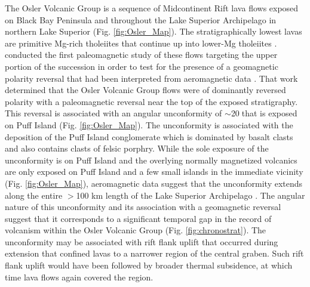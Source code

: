 \documentclass[11pt,letterpaper]{article}
\begin{document}
The Osler Volcanic Group is a sequence of Midcontinent Rift lava flows exposed on Black Bay Peninsula and throughout the Lake Superior Archipelago in northern Lake Superior (Fig. \ref{fig:Osler_Map}). The stratigraphically lowest lavas are primitive Mg-rich tholeiites that continue up into lower-Mg tholeiites \citep{Keays2015a}. \cite{Halls1974a} conducted the first paleomagnetic study of these flows targeting the upper portion of the succession in order to test for the presence of a geomagnetic polarity reversal that had been interpreted from aeromagnetic data \citep{Halls1972a}. That work determined that the Osler Volcanic Group flows were of dominantly reversed polarity with a paleomagnetic reversal near the top of the exposed stratigraphy. This reversal is associated with an angular unconformity of $\sim$20\textdegree$\;$that is exposed on Puff Island (Fig. \ref{fig:Osler_Map}). The unconformity is associated with the deposition of the Puff Island conglomerate which is dominated by basalt clasts and also contains clasts of felsic porphry. While the sole exposure of the unconformity is on Puff Island and the overlying normally magnetized volcanics are only exposed on Puff Island and a few small islands in the immediate vicinity (Fig. \ref{fig:Osler_Map}), aeromagnetic data suggest that the unconformity extends along the entire $>$100 km length of the Lake Superior Archipelago \citep{Halls1972a, Halls1974a}. The angular nature of this unconformity and its association with a geomagnetic reversal suggest that it corresponds to a significant temporal gap in the record of volcanism within the Osler Volcanic Group (Fig. \ref{fig:chronostrat}). The unconformity may be associated with rift flank uplift that occurred during extension that confined lavas to a narrower region of the central graben. Such rift flank uplift would have been followed by broader thermal subsidence, at which time lava flows again covered the region.
\end{document}
